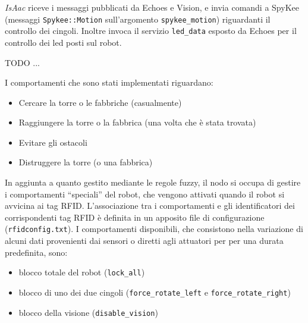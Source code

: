  \emph{IsAac} riceve i messaggi pubblicati da Echoes e Vision, e invia comandi a SpyKee (messaggi \verb|Spykee::Motion| sull'argomento \verb|spykee_motion|) riguardanti il controllo dei cingoli. Inoltre invoca il servizio \verb|led_data| esposto da Echoes per il controllo dei led posti sul robot.


TODO ...

I comportamenti che sono stati implementati riguardano:
\begin{itemize}
 \item Cercare la torre o le fabbriche (casualmente)
 \item Raggiungere la torre o la fabbrica (una volta che è stata trovata)
 \item Evitare gli ostacoli
 \item Distruggere la torre (o una fabbrica)
\end{itemize}


In aggiunta a quanto gestito mediante le regole fuzzy, il nodo si occupa di gestire i comportamenti ``speciali'' del robot, che vengono attivati quando il robot si avvicina ai tag RFID. L'associazione tra i comportamenti e gli identificatori dei corrispondenti tag RFID è definita in un apposito file di configurazione (\verb|rfidconfig.txt|). I comportamenti disponibili, che consistono nella variazione di alcuni dati provenienti dai sensori o diretti agli attuatori per per una durata predefinita, sono:
\begin{itemize}
 \item blocco totale del robot (\verb|lock_all|)
 \item blocco di uno dei due cingoli (\verb|force_rotate_left| e \verb|force_rotate_right|)
 \item blocco della visione (\verb|disable_vision|)
\end{itemize}

